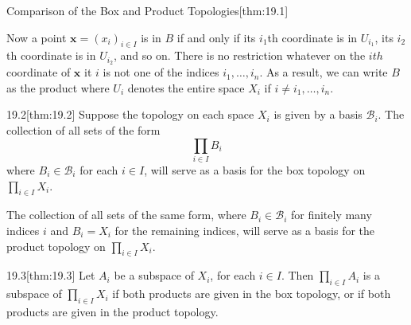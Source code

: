 \begin{thmBox}{Comparison of the Box and Product Topologies}[thm:19.1]
\begin{proofBox}
        \baseSkip

        Now a point \( \mathbf{x} = ( x_{ i } )_{ i \in I } \) is in \( B \)
        if and only if its \( i_{ 1 } \)th coordinate is in \( U_{ i_{ 1 } } \),
        its \( i_{ 2 } \)th coordinate is in \( U_{ i_{ 2 } } \), and so on.
        There is no restriction whatever on the \( ith \) coordinate of 
        \( \mathbf{x} \) it \( i \) is not one of the indices \( i_{ 1 }
        , \ldots , i_{ n } \). 
        As a result, we can write \( B \) as the product where \( U_{ i } \)
        denotes the entire space \( X_{ i } \) if \( i \neq i_{ 1 } , \ldots , 
        i_{ n } \).
    \end{proofBox}
\end{thmBox}

\begin{thmBox}{19.2}[thm:19.2]
    Suppose the topology on each space \( X_{ i } \) is given by a basis 
    \( \mathcal{B}_{ i } \).
    The collection of all sets of the form 
    \begin{equation*}
        \prod_{ i \in I } B_{ i }
    \end{equation*}
    where \( B_{ i } \in \mathcal{B}_{ i } \) for each \( i \in I \), will 
    serve as a basis for the box topology on \( \prod_{ i \in I } X_{ i } \).

    \baseSkip 

    The collection of all sets of the same form, where \( B_{ i } \in 
    \mathcal{B}_{ i } \) for finitely many indices \( i \) and \( B_{ i } = 
    X_{ i } \) for the remaining indices, will serve as a basis for the 
    product topology on \( \prod_{ i \in I } X_{ i } \).

    \baseRule

    \begin{proofBox}

    \end{proofBox}
\end{thmBox}

\begin{thmBox}{19.3}[thm:19.3]
    Let \( A_{ i } \) be a subspace of \( X_{ i } \), for each \( i \in I \).
    Then \( \prod_{ i \in I } A_{ i } \) is a subspace of \( \prod_{ i \in I }
    X_{ i } \) if both products are given in the box topology, or if both
    products are given in the product topology.

    \baseRule

    \begin{proofBox}

    \end{proofBox}
\end{thmBox}

